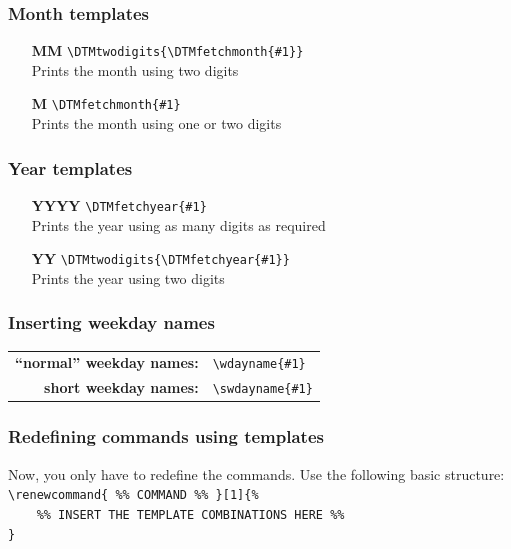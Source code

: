 \documentclass[11pt]{ltxdoc}
\begin{document}
	\subsubsection*{Month templates}
	\begin{itemize}
		\item[\sffamily\bfseries MM]
		\verb|\DTMtwodigits{\DTMfetchmonth{#1}}| \\
		Prints the month using two digits

		\item[\sffamily\bfseries M]
		\verb|\DTMfetchmonth{#1}| \\
		Prints the month using one or two digits
	\end{itemize}
	
	\subsubsection*{Year templates}
	\begin{itemize}
		\item[\sffamily\bfseries YYYY]
		\verb|\DTMfetchyear{#1}| \\
		Prints the year using as many digits as required
		
		\item[\sffamily\bfseries YY]
		\verb|\DTMtwodigits{\DTMfetchyear{#1}}| \\
		Prints the year using two digits
	\end{itemize}
	
	\subsubsection*{Inserting weekday names}
	\begin{tabular}{>{\sffamily\bfseries}rl}
		\enquote{normal} weekday names: & \verb|\wdayname{#1}|  \\
		           short weekday names: & \verb|\swdayname{#1}|
	\end{tabular}
	
	\subsubsection*{Redefining commands using templates}
	Now, you only have to redefine the commands. Use the following basic structure: \\
	\verb|\renewcommand{ %% COMMAND %% }[1]{%| \\
	\verb|    %% INSERT THE TEMPLATE COMBINATIONS HERE %%| \\
	\verb|}|
	
\end{document}

